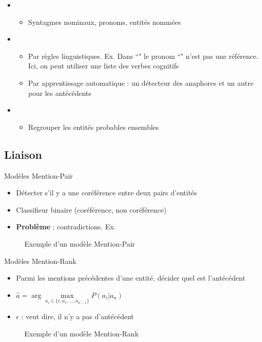 \documentclass{KodeBook}
\begin{document}
\begin{itemize}
	\item {}
	\begin{itemize}
		\item Syntagmes nominaux, pronoms, entités nommées
	\end{itemize}
	
	\item {}
	\begin{itemize}
		\item Par règles linguistiques. Ex. Dans ``" le pronom ``" n'est pas une référence. Ici, on peut utiliser une liste des verbes cognitifs 
		\item Par apprentissage automatique : un détecteur des anaphores et un autre pour les antécédents
	\end{itemize}
	
	\item {}
	\begin{itemize}
		\item Regrouper les entités probables ensembles
	\end{itemize}
\end{itemize}

\subsection{Liaison}

Modèles Mention-Pair
\begin{itemize}
	\item Détecter s'il y a une coréférence entre deux pairs d'entités
	\item Classifieur binaire (coréférence, non coréférence)
	\item \textbf{Problème} : contradictions. Ex. 
\end{itemize}
\begin{figure}
	\centering
	\caption{Exemple d'un modèle Mention-Pair \cite{2019-jurafsky-martin}}
\end{figure}

Modèles Mention-Rank
\begin{itemize}
	\item Parmi les mentions précédentes d'une entité, décider quel est l'antécédent
	\item $ \hat{a} = \arg\max\limits_{a_i \in \{\epsilon, a_1, \ldots, a_{n-1}\}} P(a_i|a_n) $
	\item $ \epsilon $ : veut dire, il n'y a pas d'antécédent
\end{itemize}
\begin{figure}
	\centering
	\caption{Exemple d'un modèle Mention-Rank \cite{2019-jurafsky-martin}}
\end{figure}
\end{document}
